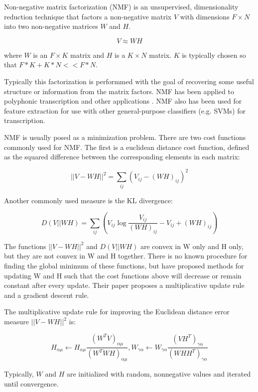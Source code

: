 \documentclass[5p]{elsarticle}
\begin{document}
Non-negative matrix factorization (NMF) is an unsupervised, dimensionality reduction technique that factors a non-negative matrix $V$ with dimensions $F \times N$ into two non-negative matrices $W$ and $H$.

\[ V \approx WH \]

\noindent where $W$ is an $F \times K$ matrix and $H$ is a $K \times N$ matrix. $K$ is typically chosen so that $F*K + K*N << F*N$.

Typically this factorization is performmed with the goal of recovering some useful structure or information from the matrix factors. NMF has been applied to polyphonic transcription and other applications \cite{smaragdis2003non}. NMF also has been used for feature extraction for use with other general-purpose classifiers (e.g. SVMs) for transcription.

NMF is usually posed as a minimization problem. There are two cost functions commonly used for NMF. The first is a euclidean distance cost function, defined as the squared difference between the corresponding elements in each matrix:

\[ \displaystyle ||V-WH||^{2} = \sum_{ij} (V_{ij} - (WH)_{ij})^{2} \]

\noindent Another commonly used measure is the KL divergence:

\[ \displaystyle D(V||WH) = \sum_{ij} (V_{ij} \log \frac{V_{ij}}{(WH)_{ij}} - V_{ij} + (WH)_{ij}) \]


The functions $||V-WH||^{2}$ and $D(V||WH)$ are convex in W only and H only, but they are not convex in W and H together. There is no known procedure for finding the global minimum of these functions, but \citet{seung2001algorithms} have proposed methods for updating W and H such that the cost functions above will decrease or remain constant after every update. Their paper proposes a multiplicative update rule and a gradient descent rule.

The multiplicative update rule for improving the Euclidean distance error measure $||V-WH||^{2}$ is:

\[ H_{\alpha \mu} \leftarrow H_{\alpha \mu} \frac{ (W^{T} V)_{\alpha \mu}}{(W^{T} W H )_{\alpha \mu}}, W_{\gamma \alpha} \leftarrow W_{\gamma \alpha} \frac{ (V H^{T})_{\gamma \alpha}} {(W H H^{T})_{\gamma \alpha}} \]

\noindent Typically, $W$ and $H$ are initialized with random, nonnegative values and iterated until convergence.
\end{document}
